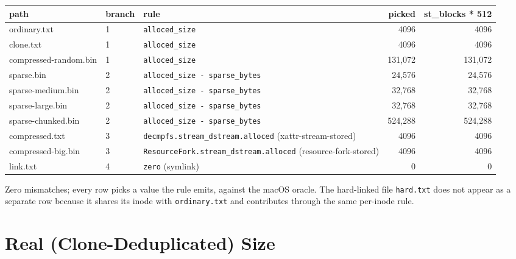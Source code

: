 \begin{center}
\begin{tabular}{lllrr}
\toprule
path & branch & rule & picked & st\_blocks * 512 \\
\midrule
ordinary.txt          & 1 & \texttt{alloced\_size}                                              &      4096 &      4096 \\
clone.txt             & 1 & \texttt{alloced\_size}                                              &      4096 &      4096 \\
compressed-random.bin & 1 & \texttt{alloced\_size}                                              &  131{,}072 &  131{,}072 \\
sparse.bin            & 2 & \texttt{alloced\_size - sparse\_bytes}                              &     24{,}576 &     24{,}576 \\
sparse-medium.bin     & 2 & \texttt{alloced\_size - sparse\_bytes}                              &     32{,}768 &     32{,}768 \\
sparse-large.bin      & 2 & \texttt{alloced\_size - sparse\_bytes}                              &     32{,}768 &     32{,}768 \\
sparse-chunked.bin    & 2 & \texttt{alloced\_size - sparse\_bytes}                              &    524{,}288 &    524{,}288 \\
compressed.txt        & 3 & \texttt{decmpfs.stream\_dstream.alloced} (xattr-stream-stored)      &      4096 &      4096 \\
compressed-big.bin    & 3 & \texttt{ResourceFork.stream\_dstream.alloced} (resource-fork-stored)&      4096 &      4096 \\
link.txt              & 4 & \texttt{zero} (symlink)                                              &         0 &         0 \\
\bottomrule
\end{tabular}
\end{center}

Zero mismatches; every row picks a value the rule emits, against
the macOS oracle. The hard-linked file \texttt{hard.txt} does not
appear as a separate row because it shares its inode with
\texttt{ordinary.txt} and contributes through the same per-inode
rule.

\section{Real (Clone-Deduplicated) Size}
\label{ssec:real-size}

